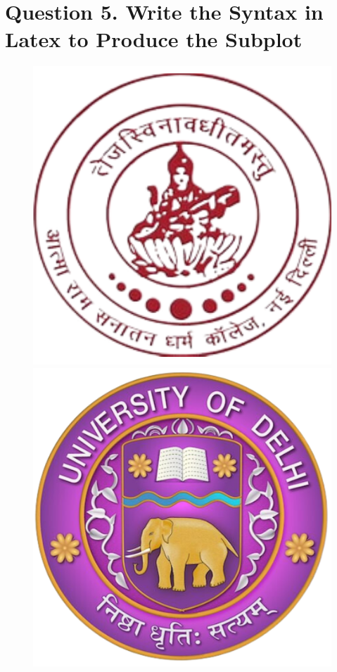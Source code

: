 \section*{Question 5. Write the Syntax in Latex to Produce the Subplot}

\begin{figure}[ht]
    \centering
    \begin{minipage}{0.45\textwidth}
        \centering
        \includegraphics[width=\textwidth]{Images/arsd_logo.png} 
    \end{minipage}\hfill
    \begin{minipage}{0.45\textwidth}
        \centering
        \includegraphics[width=\textwidth]{Images/du_logo.png}  

\end{minipage}
\end{figure}
